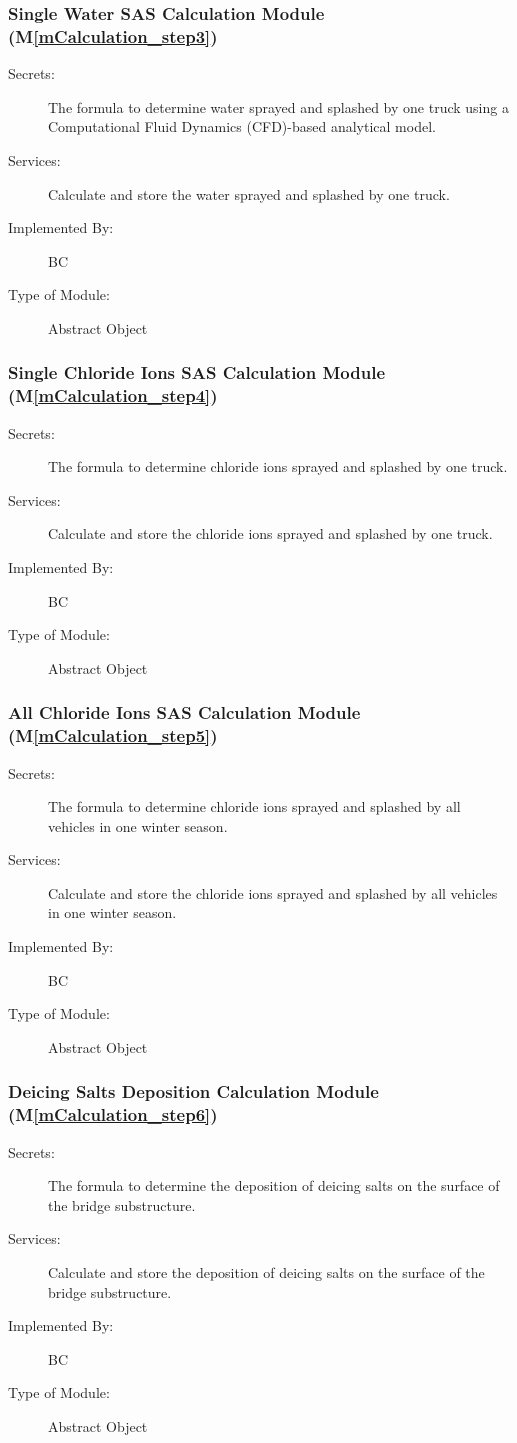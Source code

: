 \documentclass[12pt, titlepage]{article}
\newcommand{\mref}[1]{M\ref{#1}}
\begin{document}
\subsubsection{Single Water SAS Calculation Module (\mref{mCalculation_step3})}
\begin{description}
\item[Secrets:] The formula to determine water sprayed and splashed by one truck using a Computational Fluid Dynamics (CFD)-based analytical model.
\item[Services:] Calculate and store the water sprayed and splashed by one truck.
\item[Implemented By:] BC
\item[Type of Module:] Abstract Object
\end{description}

\subsubsection{Single Chloride Ions SAS Calculation Module (\mref{mCalculation_step4})}
\begin{description}
\item[Secrets:] The formula to determine chloride ions sprayed and splashed by one truck.
\item[Services:] Calculate and store the chloride ions sprayed and splashed by one truck.
\item[Implemented By:] BC
\item[Type of Module:] Abstract Object
\end{description}

\subsubsection{All Chloride Ions SAS Calculation Module (\mref{mCalculation_step5})}
\begin{description}
\item[Secrets:] The formula to determine chloride ions sprayed and splashed by all vehicles in one winter season.
\item[Services:] Calculate and store the chloride ions sprayed and splashed by all vehicles in one winter season.
\item[Implemented By:] BC
\item[Type of Module:] Abstract Object
\end{description}

\subsubsection{Deicing Salts Deposition Calculation Module (\mref{mCalculation_step6})}
\begin{description}
\item[Secrets:] The formula to determine the deposition of deicing salts on the surface of the bridge substructure.
\item[Services:] Calculate and store the deposition of deicing salts on the surface of the bridge substructure.
\item[Implemented By:] BC
\item[Type of Module:] Abstract Object
\end{description}
\end{document}
